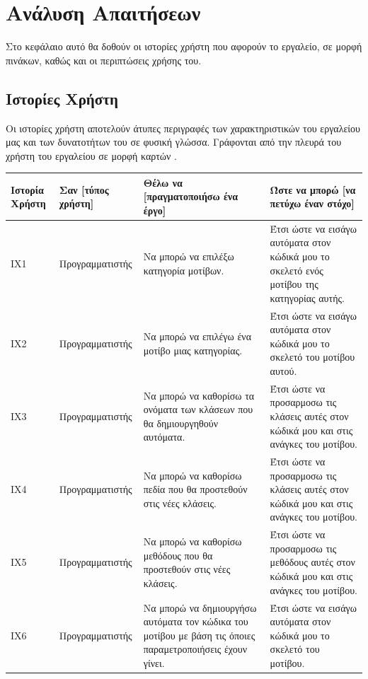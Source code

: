 \chapter{Ανάλυση Απαιτήσεων}
Στο κεφάλαιο αυτό θα δοθούν οι ιστορίες χρήστη που αφορούν το εργαλείο, σε μορφή πινάκων, καθώς  και οι περιπτώσεις χρήσης του.

\label{ch:requirmentAnalysis}
\section{Ιστορίες Χρήστη}
\label{sec:userStories}
Οι ιστορίες χρήστη αποτελούν άτυπες περιγραφές  των χαρακτηριστικών του εργαλείου μας και των δυνατοτήτων του σε φυσική γλώσσα. 
Γράφονται από την πλευρά του χρήστη του εργαλείου σε μορφή καρτών \cite{SWEBOK}.
\begin{table}[H]
	\hspace*{-0.2cm}
    \centering
    \scriptsize
	\begin{tabular}{|p{1.5cm}|p{3.5cm}|p{4.5cm}|p{4.7cm}|}
    \hline
        \textbf{Ιστορία Χρήστη} & \textbf{Σαν [τύπος χρήστη]} & \textbf{Θέλω να [πραγματοποιήσω ένα έργο]} & \textbf{Ώστε να μπορώ [να πετύχω έναν στόχο]} \\ \hline     \hline
        ΙΧ1 & Προγραμματιστής & Να μπορώ να επιλέξω κατηγορία μοτίβων. & Έτσι ώστε να εισάγω αυτόματα στον κώδικά μου το σκελετό ενός μοτίβου της κατηγορίας αυτής. \\ \hline
        ΙΧ2 & Προγραμματιστής & Να μπορώ να επιλέγω ένα μοτίβο μιας κατηγορίας. & Έτσι ώστε να  εισάγω αυτόματα στον κώδικά μου το σκελετό του μοτίβου αυτού. \\ \hline
        ΙΧ3 & Προγραμματιστής & Να μπορώ να καθορίσω τα ονόματα των κλάσεων που θα δημιουργηθούν αυτόματα. & Έτσι ώστε να προσαρμοσω τις κλάσεις αυτές στον κώδικά μου και στις ανάγκες του μοτίβου. \\ \hline
        ΙΧ4 & Προγραμματιστής & Να μπορώ να καθορίσω πεδία που θα προστεθούν στις νέες κλάσεις.  & Έτσι ώστε να προσαρμοσω τις κλάσεις αυτές στον κώδικά μου και στις ανάγκες του μοτίβου. \\ \hline
        ΙΧ5 & Προγραμματιστής & Να μπορώ να καθορίσω μεθόδους που θα προστεθούν στις νέες κλάσεις. & Έτσι ώστε να προσαρμοσω τις μεθόδους αυτές στον κώδικά μου και στις ανάγκες του μοτίβου. \\ \hline
        ΙΧ6 & Προγραμματιστής & Να μπορώ να δημιουργήσω αυτόματα τον κώδικα του μοτίβου με βάση τις όποιες παραμετροποιήσεις έχουν γίνει. & Έτσι ώστε να εισάγω αυτόματα στον κώδικά μου το σκελετό του μοτίβου. \\ \hline

\end{tabular}
\end{table}
